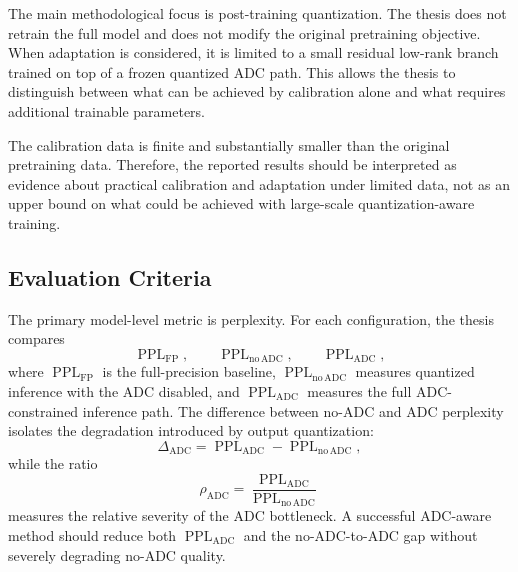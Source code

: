 \documentclass[a4paper,11pt,oneside]{article}
\theoremstyle{breakstyle}
\begin{document}
The main methodological focus is post-training quantization. The thesis does not retrain the full model and does not modify the original pretraining objective. When adaptation is considered, it is limited to a small residual low-rank branch trained on top of a frozen quantized ADC path. This allows the thesis to distinguish between what can be achieved by calibration alone and what requires additional trainable parameters.

The calibration data is finite and substantially smaller than the original pretraining data. Therefore, the reported results should be interpreted as evidence about practical calibration and adaptation under limited data, not as an upper bound on what could be achieved with large-scale quantization-aware training.

\subsection{Evaluation Criteria}
\label{subsec:evaluation_criteria}

The primary model-level metric is perplexity. For each configuration, the thesis compares
\begin{equation}
    \operatorname{PPL}_{\mathrm{FP}},
    \qquad
    \operatorname{PPL}_{\mathrm{no\,ADC}},
    \qquad
    \operatorname{PPL}_{\mathrm{ADC}},
\end{equation}
where \(\operatorname{PPL}_{\mathrm{FP}}\) is the full-precision baseline, \(\operatorname{PPL}_{\mathrm{no\,ADC}}\) measures quantized inference with the ADC disabled, and \(\operatorname{PPL}_{\mathrm{ADC}}\) measures the full ADC-constrained inference path. The difference between no-ADC and ADC perplexity isolates the degradation introduced by output quantization:
\begin{equation}
    \Delta_{\mathrm{ADC}}
    =
    \operatorname{PPL}_{\mathrm{ADC}}
    -
    \operatorname{PPL}_{\mathrm{no\,ADC}},
\end{equation}
while the ratio
\begin{equation}
    \rho_{\mathrm{ADC}}
    =
    \frac{
        \operatorname{PPL}_{\mathrm{ADC}}
    }{
        \operatorname{PPL}_{\mathrm{no\,ADC}}
    }
\end{equation}
measures the relative severity of the ADC bottleneck. A successful ADC-aware method should reduce both \(\operatorname{PPL}_{\mathrm{ADC}}\) and the no-ADC-to-ADC gap without severely degrading no-ADC quality.
\end{document}
